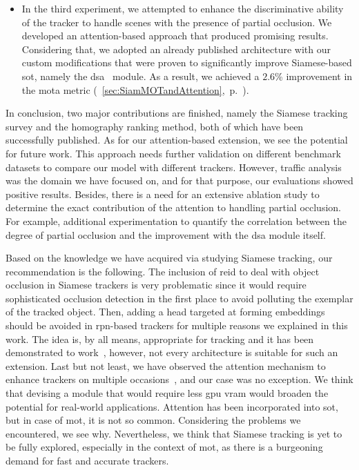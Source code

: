 \begin{enumerate}
\begin{itemize}
              \item In the third experiment, we attempted to enhance the discriminative ability of the tracker to handle scenes with the presence of partial occlusion. We developed an attention-based approach that produced promising results. Considering that, we adopted an already published architecture with our custom modifications that were proven to significantly improve Siamese-based \gls{sot}, namely the \gls{dsa}~\cite{yu2021dsa} module. As a result, we achieved a $2.6$\% improvement in the \gls{mota} metric (\sectiontext{}~\ref{sec:SiamMOTandAttention},~p.~\pageref{sec:SiamMOTandAttention}).
          \end{itemize}
\end{enumerate}

In conclusion, two major contributions are finished, namely the Siamese tracking survey and the homography ranking method, both of which have been successfully published. As for our attention-based extension, we see the potential for future work. This approach needs further validation on different benchmark datasets to compare our model with different trackers. However, traffic analysis was the domain we have focused on, and for that purpose, our evaluations showed positive results. Besides, there is a need for an extensive ablation study to determine the exact contribution of the attention to handling partial occlusion. For example, additional experimentation to quantify the correlation between the degree of partial occlusion and the improvement with the \gls{dsa} module itself.

Based on the knowledge we have acquired via studying Siamese tracking, our recommendation is the following. The inclusion of \gls{reid} to deal with object occlusion in Siamese trackers is very problematic since it would require sophisticated occlusion detection in the first place to avoid polluting the exemplar of the tracked object. Then, adding a head targeted at forming embeddings should be avoided in \gls{rpn}-based trackers for multiple reasons we explained in this work. The idea is, by all means, appropriate for tracking and it has been demonstrated to work~\cite{lu2020retinatrack, zhang2021fairmot}, however, not every architecture is suitable for such an extension. Last but not least, we have observed the attention mechanism to enhance trackers on multiple occasions~\cite{he2018twofoldsiam, wang2018learningattentions, yu2021dsa, li2018spatialawaresiam}, and our case was no exception. We think that devising a module that would require less \gls{gpu} \gls{vram} would broaden the potential for real-world applications. Attention has been incorporated into \gls{sot}, but in case of \gls{mot}, it is not so common. Considering the problems we encountered, we see why. Nevertheless, we think that Siamese tracking is yet to be fully explored, especially in the context of \gls{mot}, as there is a burgeoning demand for fast and accurate trackers.